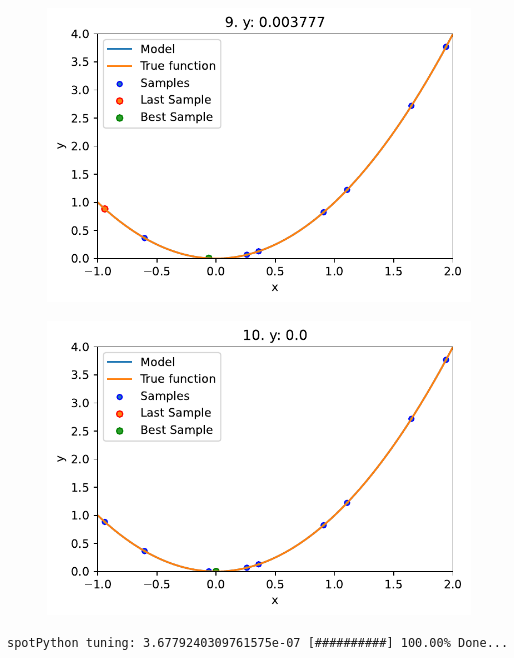 \documentclass[
  letterpaper,
  DIV=11,
  numbers=noendperiod]{scrreprt}
\begin{document}
\begin{figure}[H]

{\centering \includegraphics{01_spot_intro_files/figure-pdf/cell-10-output-1.pdf}

}

\end{figure}

\begin{figure}[H]

{\centering \includegraphics{01_spot_intro_files/figure-pdf/cell-10-output-2.pdf}

}

\end{figure}

\begin{verbatim}
spotPython tuning: 3.6779240309761575e-07 [##########] 100.00% Done...
\end{verbatim}
\end{document}
